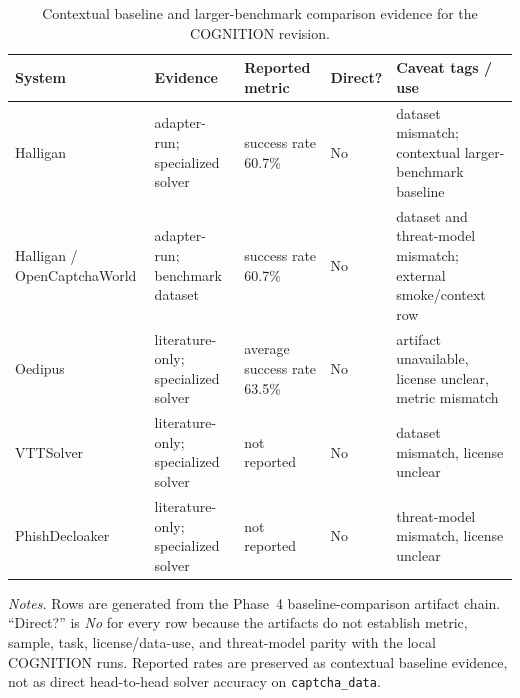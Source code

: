 \begin{table}[t]
\centering
\scriptsize
\setlength{\tabcolsep}{3pt}
\renewcommand{\arraystretch}{1.08}
\begin{tabularx}{\textwidth}{@{}>{\raggedright\arraybackslash}p{}>{\raggedright\arraybackslash}p{}>{\raggedright\arraybackslash}p{}>{\raggedright\arraybackslash}p{}>{\raggedright\arraybackslash}X@{}}
\toprule
System & Evidence & Reported metric & Direct? & Caveat tags / use \\
\midrule
Halligan & adapter-run; specialized solver & success rate 60.7\% & No & dataset mismatch; contextual larger-benchmark baseline \\
Halligan / OpenCaptchaWorld & adapter-run; benchmark dataset & success rate 60.7\% & No & dataset and threat-model mismatch; external smoke/context row \\
Oedipus & literature-only; specialized solver & average success rate 63.5\% & No & artifact unavailable, license unclear, metric mismatch \\
VTTSolver & literature-only; specialized solver & not reported & No & dataset mismatch, license unclear \\
PhishDecloaker & literature-only; specialized solver & not reported & No & threat-model mismatch, license unclear \\
\bottomrule
\end{tabularx}
\vspace{0.5em}
\scriptsize
\textit{Notes.}
Rows are generated from the Phase~4 baseline-comparison artifact chain. ``Direct?'' is \textit{No} for every row because the artifacts do not establish metric, sample, task, license/data-use, and threat-model parity with the local COGNITION runs. Reported rates are preserved as contextual baseline evidence, not as direct head-to-head solver accuracy on \texttt{captcha\_data}.
\caption{Contextual baseline and larger-benchmark comparison evidence for the COGNITION revision.}
\label{tab:phase4-baseline-comparison}
\end{table}
